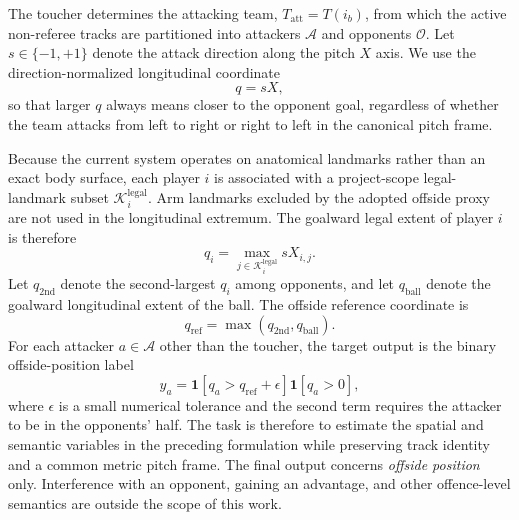 \documentclass[runningheads]{llncs}
\begin{document}
The toucher determines the attacking team, $T_{\mathrm{att}}=T(i_b)$, from which the active non-referee tracks are partitioned into attackers $\mathcal A$ and opponents $\mathcal O$. Let $s\in\{-1,+1\}$ denote the attack direction along the pitch $X$ axis. We use the direction-normalized longitudinal coordinate
\begin{equation}
q=sX,
\label{eq:problem_q}
\end{equation}
so that larger $q$ always means closer to the opponent goal, regardless of whether the team attacks from left to right or right to left in the canonical pitch frame.

Because the current system operates on anatomical landmarks rather than an exact body surface, each player $i$ is associated with a project-scope legal-landmark subset $\mathcal K_i^{\mathrm{legal}}$. Arm landmarks excluded by the adopted offside proxy are not used in the longitudinal extremum. The goalward legal extent of player $i$ is therefore
\begin{equation}
q_i=\max_{j\in\mathcal K_i^{\mathrm{legal}}} sX_{i,j}.
\label{eq:problem_player_extent}
\end{equation}
Let $q_{\mathrm{2nd}}$ denote the second-largest $q_i$ among opponents, and let $q_{\mathrm{ball}}$ denote the goalward longitudinal extent of the ball. The offside reference coordinate is
\begin{equation}
q_{\mathrm{ref}}=\max(q_{\mathrm{2nd}},q_{\mathrm{ball}}).
\label{eq:problem_reference}
\end{equation}
For each attacker $a\in\mathcal A$ other than the toucher, the target output is the binary offside-position label
\begin{equation}
y_a=
\mathbf{1}\!\left[q_a>q_{\mathrm{ref}}+\epsilon\right]
\mathbf{1}\!\left[q_a>0\right],
\label{eq:problem_target}
\end{equation}
where $\epsilon$ is a small numerical tolerance and the second term requires the attacker to be in the opponents' half. The task is therefore to estimate the spatial and semantic variables in the preceding formulation while preserving track identity and a common metric pitch frame. The final output concerns \emph{offside position} only. Interference with an opponent, gaining an advantage, and other offence-level semantics are outside the scope of this work.

\end{document}
